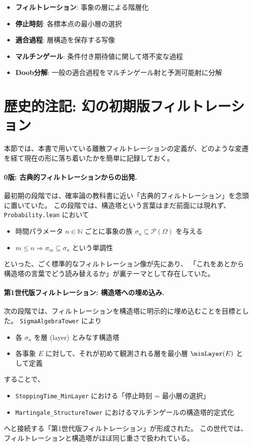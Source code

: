 \documentclass[a4paper,12pt]{ltjsarticle}
\theoremstyle{definition}
\begin{document}
\begin{itemize}
  \item \textbf{フィルトレーション}: 事象の層による階層化
  \item \textbf{停止時刻}: 各標本点の最小層の選択
  \item \textbf{適合過程}: 層構造を保存する写像
  \item \textbf{マルチンゲール}: 条件付き期待値に関して塔不変な過程
  \item \textbf{Doob分解}: 一般の適合過程をマルチンゲール射と予測可能射に分解
\end{itemize}

\section{歴史的注記: 幻の初期版フィルトレーション}

本節では、本書で用いている離散フィルトレーションの定義が、どのような変遷を経て現在の形に落ち着いたかを簡単に記録しておく。

\paragraph{0版: 古典的フィルトレーションからの出発.}
最初期の段階では、確率論の教科書に近い「古典的フィルトレーション」を念頭に置いていた。
この段階では、構造塔という言葉はまだ前面には現れず、\texttt{Probability.lean} において
\begin{itemize}
  \item 時間パラメータ $n \in \mathbb{N}$ ごとに事象の族 $\sigma_n \subseteq \mathcal{P}(\Omega)$ を与える
  \item $m \le n \Rightarrow \sigma_m \subseteq \sigma_n$ という単調性
\end{itemize}
といった、ごく標準的なフィルトレーション像が先にあり、
「これをあとから構造塔の言葉でどう読み替えるか」が裏テーマとして存在していた。

\paragraph{第1世代版フィルトレーション: 構造塔への埋め込み.}
次の段階では、フィルトレーションを構造塔に明示的に埋め込むことを目標とした。
\texttt{SigmaAlgebraTower} により
\begin{itemize}
  \item 各 $\sigma_n$ を層 (layer) とみなす構造塔
  \item 各事象 $E$ に対して、それが初めて観測される層を最小層 $\minLayer(E)$ として定義
\end{itemize}
することで、
\begin{itemize}
  \item \texttt{StoppingTime\_MinLayer} における「停止時刻 = 最小層の選択」
  \item \texttt{Martingale\_StructureTower} におけるマルチンゲールの構造塔的定式化
\end{itemize}
へと接続する「第1世代版フィルトレーション」が形成された。
この世代では、フィルトレーションと構造塔がほぼ同じ重さで扱われている。
\end{document}
